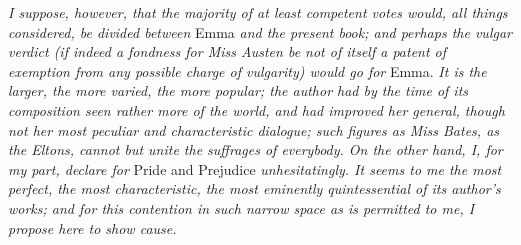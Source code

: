 \textit{I suppose, however, that the majority of at least competent votes would, all things considered, be divided between} Emma \textit{and the present book; and perhaps the vulgar verdict (if indeed a fondness for Miss Austen be not of itself a patent of exemption from any possible charge of vulgarity) would go for} Emma. \textit{It is the larger, the more varied, the more popular; the author had by the time of its composition seen rather more of the world, and had improved her general, though not her most peculiar and characteristic dialogue; such figures as Miss Bates, as the Eltons, cannot but unite the suffrages of everybody. On the other hand, I, for my part, declare for} Pride and Prejudice \textit{unhesitatingly. It seems to me the most perfect, the most characteristic, the most eminently quintessential of its author's works; and for this contention in such narrow space as is permitted to me, I propose here to show cause.}

